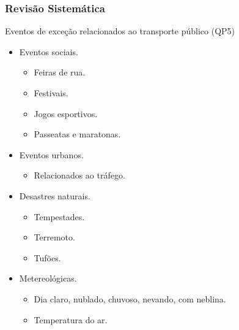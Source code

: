 \documentclass{beamer}
\begin{document}
\begin{frame}
\frametitle{Revisão Sistemática}
\begin{block}{Eventos de exceção relacionados ao transporte público (QP5)}
\begin{itemize}
\item \alert{Eventos sociais}.
\begin{itemize}
\item Feiras de rua.
\item Festivais.
\item Jogos esportivos.
\item Passeatas e maratonas.
\end{itemize}

\item \alert{Eventos urbanos}.
\begin{itemize}
\item Relacionados ao tráfego.
\end{itemize}

\item \alert{Desastres naturais}.
\begin{itemize}
\item Tempestades.
\item Terremoto.
\item Tufões.
\end{itemize}

\item \alert{Metereológicas}.
\begin{itemize}
\item Dia claro, nublado, chuvoso, nevando, com neblina.
\item Temperatura do ar.
\end{itemize}

\end{itemize}
\end{block}
\end{frame}
\end{document}

